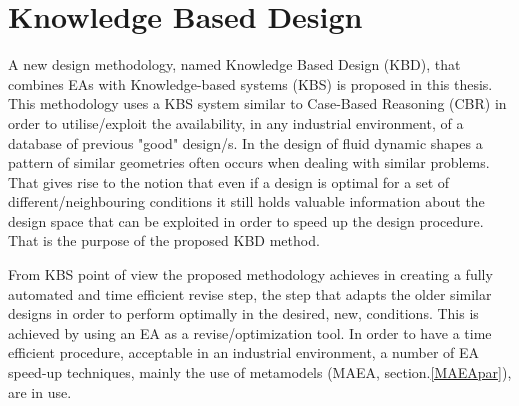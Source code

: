 \chapter{Knowledge Based Design} %

\ifpdf
    \graphicspath{{3/figures/PNG/}{3/figures/PDF/}{2.5/figures/}}
\else
    \graphicspath{{3/figures/EPS/}{3/figures/}}
\fi


A new design methodology, named Knowledge Based Design (KBD), that combines EAs with Knowledge-based systems (KBS)  is proposed in this thesis. This methodology uses a KBS system similar to Case-Based Reasoning (CBR) in order to utilise/exploit the availability, in any industrial environment, of a database of previous "good" design/s. In the design of fluid dynamic shapes a pattern of similar geometries often occurs when dealing with similar problems. That gives rise to the notion that even if a design is optimal for a set of different/neighbouring conditions it still holds valuable information about the design space that can be exploited in order to speed up the design procedure. That is the purpose of the proposed KBD method.  

From KBS point of view the proposed methodology achieves in creating a fully automated and time efficient revise step, the step that adapts the older similar designs in order to perform optimally in the desired, new, conditions. This is achieved by using an EA as a revise/optimization tool. In order to have a time efficient procedure, acceptable in an industrial environment, a number of EA speed-up techniques, mainly the use of metamodels (MAEA, section.\ref{MAEApar}), are in use.  

